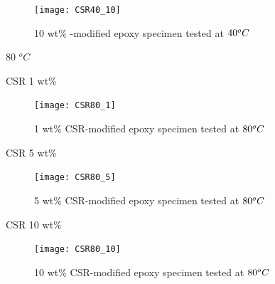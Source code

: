 \documentclass[numbers=noendperiod,chapterprefix=on]{icldt} %
\begin{document}
{\begin{figure}[!htpb]
\centering
\texttt{[image: CSR40\_10]} 
\caption{10 wt\% -modified epoxy specimen tested at $\-40 ^oC$}\label{CSR40_10}
\end{figure}
\FloatBarrier

80 $^oC$

CSR 1 wt\%

\begin{figure}[!htpb]
\centering
\texttt{[image: CSR80\_1]} 
\caption{1 wt\% CSR-modified epoxy specimen tested at $\-80 ^oC$}\label{CSR80_1}
\end{figure}
\FloatBarrier

CSR 5 wt\%

\begin{figure}[!htpb]
\centering
\texttt{[image: CSR80\_5]} 
\caption{5 wt\% CSR-modified epoxy specimen tested at $\-80 ^oC$}\label{CSR80_5}
\end{figure}
\FloatBarrier

CSR 10 wt\%

\begin{figure}[!htpb]
\centering
\texttt{[image: CSR80\_10]} 
\caption{10 wt\% CSR-modified epoxy specimen tested at $\-80 ^oC$}\label{CSR80_10}
\end{figure}
\FloatBarrier


%
%

}
\end{document}
